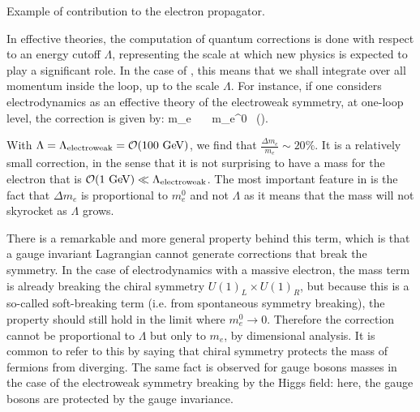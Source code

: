                  {Example of contribution to the electron propagator.}

    In effective theories, the computation of quantum corrections is done with respect to
    an energy cutoff $\Lambda$, representing the scale at which new physics is expected
    to play a significant role. In the case of ,
    this means that we shall integrate over all momentum inside the loop, up to the scale $\Lambda$.
    For instance, if one considers electrodynamics as an effective theory of the electroweak
    symmetry, at one-loop level, the correction is given by:
    {
        \Delta m_e \, \simeq \, \frac{\alpha}{4\pi} \, m_e^0 \, \left(\right).
    }

    With $\Lambda = \Lambda_{\text{electroweak}} = \mathcal{O}(100~\text{GeV})$, we find that
    $\frac{\Delta m_e}{m_e} \sim 20\%$. It is a relatively small correction, in the sense
    that it is not surprising to have a mass for the electron that is $\mathcal{O}(1~\text{GeV}) \ll \Lambda_{\text{electroweak}}$.
    The most important feature in  is the fact that $\Delta m_e$
    is proportional to $m_e^0$ and not $\Lambda$ as it means that the mass will not skyrocket
    as $\Lambda$ grows.

    There is a remarkable and more general property behind this term, which is that a
    gauge invariant Lagrangian cannot generate corrections that break the symmetry. In
    the case of electrodynamics with a massive electron, the mass term is already breaking
    the chiral symmetry $U(1)_L \times U(1)_R$, but because this is a so-called soft-breaking
    term (i.e. from spontaneous symmetry breaking), the property should still hold in
    the limit where $m_e^0 \rightarrow 0$. Therefore the correction cannot be proportional to
    $\Lambda$ but only to $m_e$, by dimensional analysis. It is common to refer to this by
    saying that chiral symmetry protects the mass of fermions from diverging. The same fact
    is observed for gauge bosons masses in the case of the electroweak symmetry breaking by
    the Higgs field: here, the gauge bosons are protected by the gauge invariance.

